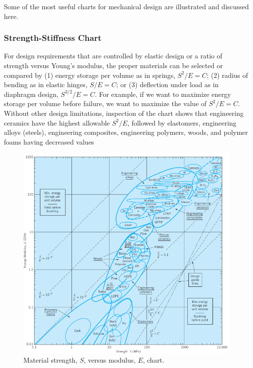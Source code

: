 \documentclass[
10pt,
a4paper,
openany,
svgnames,
]{book}
\begin{document}
Some of the most useful charts for mechanical design are illustrated and discussed here.

\subsubsection{Strength-Stiffness Chart}

For design requirements that are controlled by elastic design or a ratio of strength versus Young’s modulus, the proper materials can be selected or compared by (1) energy storage per volume as in springs, $S^2/E = C$; (2) radius of bending as in elastic hinges, $S/E = C$; or (3) deflection under load as in diaphragm design, $S^{3/2}/E = C$. For example, if we want to maximize energy storage per volume before failure, we want to maximize the value of $S^2/E = C$. Without other design limitations, inspection of the chart shows that engineering ceramics have the highest allowable $S^2/E$, followed by elastomers, engineering alloys (steels), engineering composites, engineering polymers, woods, and polymer foams having decreased values

\begin{figure}[h]
  \centering
  \includegraphics[scale=0.82]{pictures/Material-selection/strength-stiffness-diagram}
  \caption{Material strength, $S$, versus modulus, $E$, chart. \cite{ashby2010materials}}
  \label{fig: strength stiffness diagram}
\end{figure}
\end{document}
